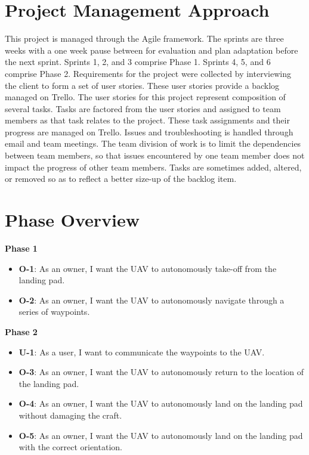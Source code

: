 \section{Project  Management Approach}
This project is managed through the Agile framework. The sprints are three weeks with a one week pause between for evaluation and plan adaptation before the next sprint. Sprints 1, 2, and 3 comprise Phase 1. Sprints 4, 5, and 6 comprise Phase 2. Requirements for the project were collected by interviewing the client to form a set of user stories. These user stories provide a backlog managed on Trello. The user stories for this project represent composition of several tasks. Tasks are factored from the user stories and assigned to team members as that task relates to the project. These task assignments and their progress are managed on Trello. Issues and troubleshooting is handled through email and team meetings. The team division of work is to limit the dependencies between team members, so that issues encountered by one team member does not impact the progress of other team members. Tasks are sometimes added, altered, or removed so as to reflect a better size-up of the backlog item.





\section{Phase  Overview}
\normalsize{\textbf{Phase 1}}
\begin{itemize}
\item \textbf{O-1}: As an owner, I want the UAV to autonomously take-off from the landing pad.
\item \textbf{O-2}: As an owner, I want the UAV to autonomously navigate through a series of waypoints.
\end{itemize}

\vspace{3mm}
\noindent\normalsize{\textbf{Phase 2}}
\begin{itemize}
\item \textbf{U-1}: As a user, I want to communicate the waypoints to the UAV.
\item \textbf{O-3}: As an owner, I want the UAV to autonomously return to the location of the landing pad.
\item \textbf{O-4}: As an owner, I want the UAV to autonomously land on the landing pad without damaging the craft.
\item \textbf{O-5}: As an owner, I want the UAV to autonomously land on the landing pad with the correct orientation.
\end{itemize}

